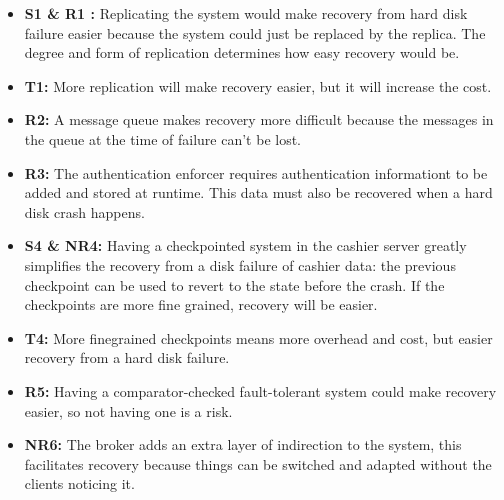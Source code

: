 \documentclass[a4paper,11pt]{report}
\begin{document}
\begin{itemize}
\item \textbf{S1 \& R1 :} Replicating the system would make recovery from hard disk failure easier because the system
could just be replaced by the replica. The degree and form of replication determines how easy recovery would be.
\item \textbf{T1:} More replication will make recovery easier, but it will increase the cost.
\item \textbf{R2:} A message queue makes recovery more difficult because the messages in the queue at the time 
of failure can't be lost.
\item \textbf{R3:} The authentication enforcer requires authentication informationt to be added and stored
at runtime. This data must also be recovered when a hard disk crash happens.
\item \textbf{S4 \& NR4:} Having a checkpointed system in the cashier server greatly simplifies the recovery
from a disk failure of cashier data: the previous checkpoint can be used to revert to the state before the crash.
If the checkpoints are more fine grained, recovery will be easier.
\item \textbf{T4:} More finegrained checkpoints means more overhead and cost, but easier recovery from a hard disk failure.
\item \textbf{R5:} Having a comparator-checked fault-tolerant system could make recovery easier, so 
not having one is a risk.
\item \textbf{NR6:} The broker adds an extra layer of indirection to the system, this facilitates recovery because
things can be switched and adapted without the clients noticing it.
\end{itemize}
\end{document}
